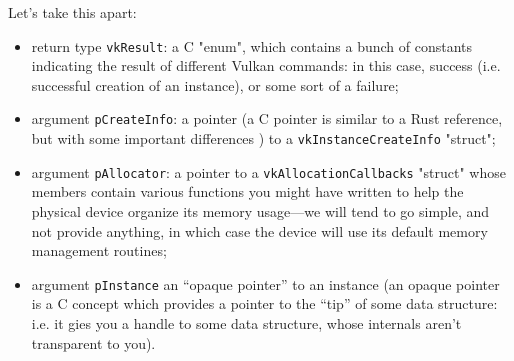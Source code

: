 \documentclass[12pt,letterpaper]{article}
\newcommand{\inquotes}[1]{``#1''}	%
\newcommand{\cil}[1]{\texttt{#1}}
\begin{document}
	Let's take this apart:
		\begin{itemize}
			\item return type \cil{vkResult}: a C "enum", which contains a bunch of  constants indicating the result of different Vulkan commands: in this case, success (i.e. successful creation of an instance), or some sort of a failure;
			
			\item argument \cil{pCreateInfo}: a pointer (a C pointer is similar to a Rust reference, but with some important differences ) to a \cil{vkInstanceCreateInfo} "struct";
			
			\item argument \cil{pAllocator}: a pointer to a \cil{vkAllocationCallbacks} "struct" whose members contain various functions you might have written to help the physical device organize its memory usage---we will tend to go simple, and not provide anything, in which case the device will use its default memory management routines;
			
			\item argument \cil{pInstance} an \inquotes{opaque pointer} to an instance (an opaque pointer is a C concept which provides a pointer to the \inquotes{tip} of some data structure: i.e. it gies you a handle to some data structure, whose internals aren't transparent to you).
		\end{itemize}
	
\end{document}
